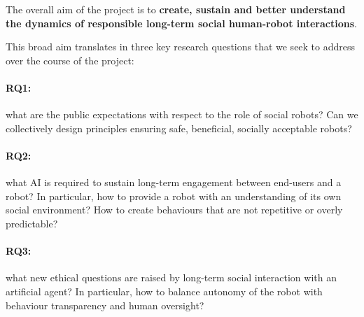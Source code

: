 


%
%

The overall aim of the \project project is to \textbf{create, sustain and better
understand the dynamics of responsible long-term social human-robot
interactions}.

This broad aim translates in three key research questions that we seek to
address over the course of the project:

\paragraph{\bf RQ1:} what are the public expectations with respect to the role of social
        robots? Can we collectively design principles ensuring safe, beneficial, socially
        acceptable robots? 

\paragraph{\bf RQ2:} what AI is required to sustain long-term engagement between end-users
        and a robot? In particular, how to provide a robot with an understanding
        of its own social environment? How to create behaviours that are not
        repetitive or overly predictable?

\paragraph{\bf RQ3:} what new ethical questions are raised by long-term social interaction
        with an artificial agent? In particular, how to balance autonomy of the
        robot with behaviour transparency and human oversight?

